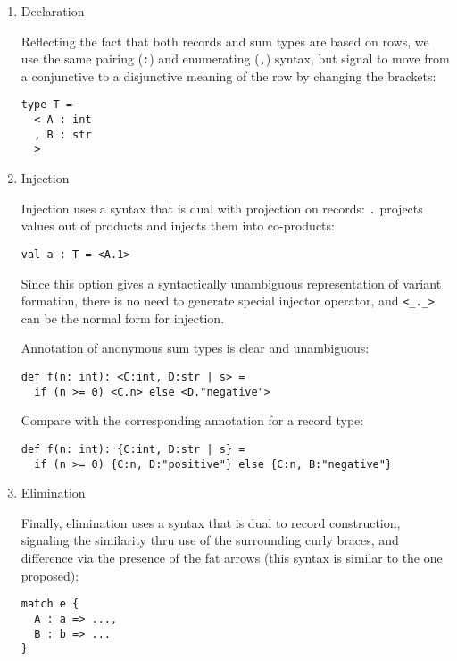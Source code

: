 \documentclass[11pt]{article}
\begin{document}
\begin{enumerate}
\item Declaration
\label{sec:org78427f0}

Reflecting the fact that both records and sum types are based on rows, we
use the same pairing (\texttt{:}) and enumerating (\texttt{,}) syntax, but signal to move from
a conjunctive to a disjunctive meaning of the row by changing the brackets:

\begin{verbatim}
type T =
  < A : int
  , B : str
  >
\end{verbatim}

\item Injection
\label{sec:orgd20c363}

Injection uses a syntax that is dual with projection on records: \texttt{.} projects
values out of products and injects them into co-products:

\begin{verbatim}
val a : T = <A.1>
\end{verbatim}

Since this option gives a syntactically unambiguous representation of
variant formation, there is no need to generate special injector operator, and
\texttt{<\_.\_>} can be the normal form for injection.

Annotation of anonymous sum types is clear and unambiguous:

\begin{verbatim}
def f(n: int): <C:int, D:str | s> =
  if (n >= 0) <C.n> else <D."negative">
\end{verbatim}

Compare with the corresponding annotation for a record type:

\begin{verbatim}
def f(n: int): {C:int, D:str | s} =
  if (n >= 0) {C:n, D:"positive"} else {C:n, B:"negative"}
\end{verbatim}

\item Elimination
\label{sec:org84c35ee}

Finally, elimination uses a syntax that is dual to record construction,
signaling the similarity thru use of the surrounding curly braces, and
difference via the presence of the fat arrows (this syntax is similar to the
one proposed):

\begin{verbatim}
match e {
  A : a => ...,
  B : b => ...
}
\end{verbatim}
\end{enumerate}
\end{document}
